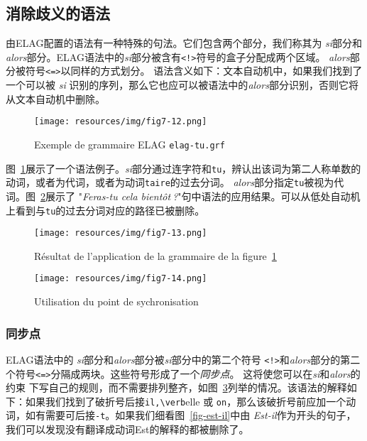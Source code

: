 \subsection{消除歧义的语法}
\label{section-elag-grammars}




由ELAG配置的语法有一种特殊的句法。它们包含两个部分，我们称其为 \textit{si}部分和\textit{alors}部分。ELAG语法中的\textit{si}部分被含有\verb+<!>+符号的盒子分配成两个区域。 \textit{alors}部分被符号\verb+<=>+以同样的方式划分。
语法含义如下：文本自动机中，如果我们找到了一个可以被 \textit{si} 识别的序列，那么它也应可以被语法中的\textit{alors}部分识别，否则它将从文本自动机中删除。

\begin{figure}[!ht]
\begin{center}
\texttt{[image: resources/img/fig7-12.png]}
\caption{Exemple de grammaire ELAG \texttt{elag-tu.grf}\label{fig-elag-tu}}
\end{center}
\end{figure}

\bigskip
\noindent 
图~\ref{fig-elag-tu}展示了一个语法例子。\textit{si}部分通过连字符和\verb+tu+，辨认出该词为第二人称单数的动词，或者为代词，或者为动词\verb+taire+的过去分词。 \textit{alors}部分指定\verb+tu+被视为代词。图~\ref{fig-applying-tu-grammar}展示了 "\textit{Feras-tu cela bientôt$~$?}"句中语法的应用结果。可以从低处自动机上看到与\verb+tu+的过去分词对应的路径已被删除。

\begin{figure}[!ht]
\begin{center}
\texttt{[image: resources/img/fig7-13.png]}
\caption{Résultat de l’application de la grammaire de la figure~\ref{fig-elag-tu}
\label{fig-applying-tu-grammar}}
\end{center}
\end{figure}

\begin{figure}[!ht]
\begin{center}
\texttt{[image: resources/img/fig7-14.png]}
\caption{Utilisation du point de sychronisation\label{fig-synchronization-point}}
\end{center}
\end{figure}

\subsubsection{同步点}
ELAG语法中的 \textit{si}部分和\textit{alors}部分被\textit{si}部分中的第二个符号 \verb+<!>+和\textit{alors}部分的第二个符号\verb+<=>+分隔成两块。这些符号形成了一个\textit{同步点}。
这将使您可以在\textit{si}和\textit{alors}的约束
下写自己的规则，而不需要排列整齐，如图~\ref{fig-synchronization-point}列举的情况。该语法的解释如下：如果我们找到了破折号后接\verb+il,\verb+elle 或 \verb+on+，那么该破折号前应加一个动词，如有需要可后接\verb+-t+。如果我们细看图~\ref{fig-est-il}中由 \textit{Est-il}作为开头的句子，我们可以发现没有翻译成动词Est的解释的都被删除了。

